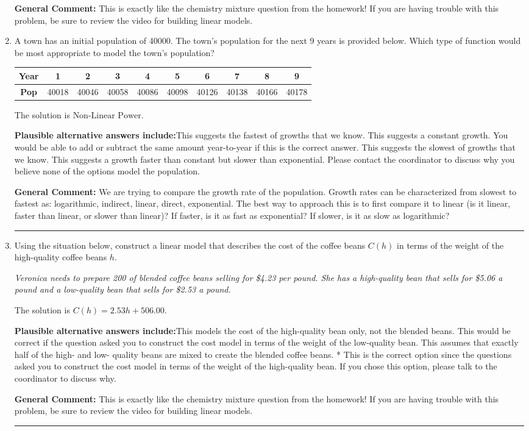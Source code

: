 \documentclass{extbook}[14pt]
\newcommand{\litem}[1]{\item #1

\rule{\textwidth}{0.4pt}}
\begin{document}
\begin{enumerate}
{\textbf{General Comment:} This is exactly like the chemistry mixture question from the homework! If you are having trouble with this problem, be sure to review the video for building linear models.
}
\litem{
A town has an initial population of 40000. The town's population for the next 9 years is provided below. Which type of function would be most appropriate to model the town's population?


\begin{tabular}{c|c|c|c|c|c|c|c|c|c}
\textbf{Year} &1 &2 &3 &4 &5 &6 &7 &8 &9\tabularnewline \hline
\textbf{Pop} &40018 &40046 &40058 &40086 &40098 &40126 &40138 &40166 &40178\end{tabular}The solution is \( \text{Non-Linear Power} \).\begin{enumerate}[label=\Alph*.]
\textbf{Plausible alternative answers include:}This suggests the fastest of growths that we know.
This suggests a constant growth. You would be able to add or subtract the same amount year-to-year if this is the correct answer.
This suggests the slowest of growths that we know.
This suggests a growth faster than constant but slower than exponential.
Please contact the coordinator to discuss why you believe none of the options model the population.
\end{enumerate}

\textbf{General Comment:} We are trying to compare the growth rate of the population. Growth rates can be characterized from slowest to fastest as: logarithmic, indirect, linear, direct, exponential. The best way to approach this is to first compare it to linear (is it linear, faster than linear, or slower than linear)? If faster, is it as fast as exponential? If slower, is it as slow as logarithmic?
}
\litem{
Using the situation below, construct a linear model that describes the cost of the coffee beans $C(h)$ in terms of the weight of the high-quality coffee beans $h$.

\begin{center}
    \textit{ Veronica needs to prepare 200 of blended coffee beans selling for \$4.23 per pound. She has a high-quality bean that sells for \$5.06 a pound and a low-quality bean that sells for \$2.53 a pound. }
\end{center}
The solution is \( C(h) = 2.53 h + 506.00 \).\begin{enumerate}[label=\Alph*.]
\textbf{Plausible alternative answers include:}This models the cost of the high-quality bean only, not the blended beans.
This would be correct if the question asked you to construct the cost model in terms of the weight of the low-quality bean.
This assumes that exactly half of the high- and low- quality beans are mixed to create the blended coffee beans.
* This is the correct option since the questions asked you to construct the cost model in terms of the weight of the high-quality bean.
If you chose this option, please talk to the coordinator to discuss why.
\end{enumerate}

\textbf{General Comment:} This is exactly like the chemistry mixture question from the homework! If you are having trouble with this problem, be sure to review the video for building linear models.
}
\end{enumerate}
\end{document}
